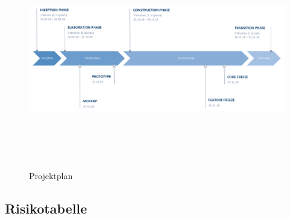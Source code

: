 \begin{landscape}
	\thispagestyle{empty}
	\label{subsec:timeline}
		\begin{figure}[h]
			\centering
			\includegraphics[width=1\linewidth, height=9.6cm]{img/projekt-plan/projekt-plan}
			\caption[Projektplan]{Projektplan}
			\label{fig:projekt-plan}
		\end{figure}
	\vspace{0.5cm}
	
	\subsection{Risikotabelle}\label{risiko-tabelle}
	
	
	\label{pdf:projekt-risiken}
	
\end{landscape}